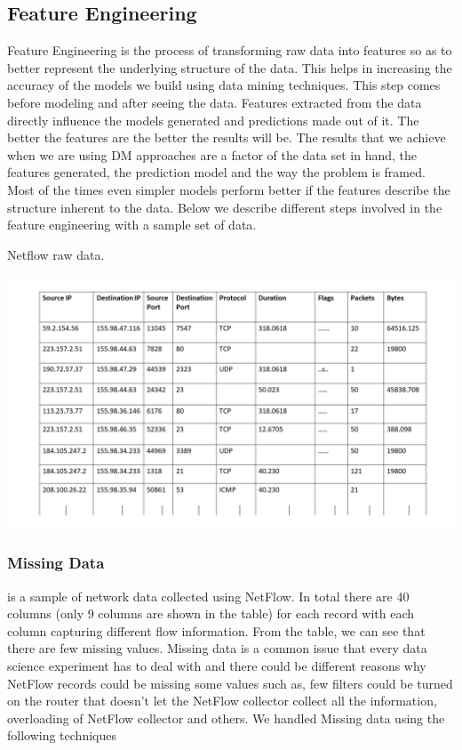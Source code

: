 \subsection{Feature Engineering}

Feature Engineering is the process of transforming raw
data into features so as to better represent the underlying structure of the data. This helps in increasing the accuracy of the models we build using data mining techniques. This step comes before modeling and after seeing the data.
Features extracted from the data directly influence the models generated and predictions made out of it. The better the features are the better the results will be. The results that we achieve when we are using DM approaches are a factor of the data set in hand, the features generated, the prediction model and the way the problem is framed. Most of the times even simpler models perform better if the features describe the structure inherent to the data. 
Below we describe different steps involved in the feature engineering with a sample set of data.
\begin{table}[t]
	\caption{Netflow raw data.}%
	\centerline{\includegraphics[scale = 0.5]{raw_data.pdf}}	
\end{table}
 
\subsubsection{Missing Data} 

 is a sample of network data collected using NetFlow. In total there are 40 columns (only 9 columns are shown in the table) for each record with each column capturing different flow information. From the table, we can see that there are few missing values. Missing data is a common issue that every data science experiment has to deal with and there could be different reasons why NetFlow records could be missing some values such as, few filters could be turned on the router that doesn't let the NetFlow collector collect all the information, overloading of NetFlow collector and others. We handled Missing data using the following techniques 

